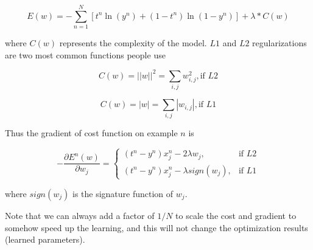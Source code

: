 \documentclass{article} %
\begin{document}
\begin{equation}
	E(w) = - \sum_{n=1}^{N}[t^{n}\ln(y^{n})+(1-t^{n})\ln(1-y^{n})] + \lambda * C(w)
\end{equation}

where $C(w)$ represents the complexity of the model. $L1$ and $L2$ regularizations are two most common functions people use

\begin{equation}
	C(w) = ||w||^{2} = \sum_{i, j}w_{i, j}^{2}, \text{if }L2
\end{equation}

\begin{equation}
	C(w) = |w| = \sum_{i, j}|w_{i, j}|, \text{if }L1
\end{equation}

Thus the gradient of cost function on example $n$ is 

\[
    -\frac{\partial E^{n}(w)}{\partial w_{j}} = 
\begin{cases}
    (t^{n}-y^{n})x_{j}^{n} - 2\lambda w_{j},& \text{if } L2\\
    (t^{n}-y^{n})x_{j}^{n} - \lambda sign(w_{j}), & \text{if } L1
\end{cases}
\]

where $sign(w_{j})$ is the signature function of $w_{j}$. 

Note that we can always add a factor of $1/N$ to scale the cost and gradient to somehow speed up the learning, and this will not change the optimization results (learned parameters).
\end{document}
